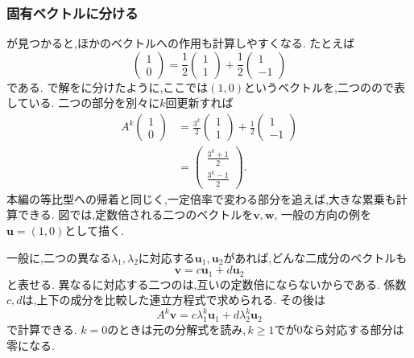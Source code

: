 \subsubsection{固有ベクトルに分ける}

が見つかると,ほかのベクトルへの作用も計算しやすくなる.
たとえば
\[
  \begin{pmatrix}1\\0\end{pmatrix}
  =\frac12\begin{pmatrix}1\\1\end{pmatrix}
   +\frac12\begin{pmatrix}1\\-1\end{pmatrix}
\]
である.
で解をに分けたように,ここでは$(1,0)$というベクトルを,二つのので表している.
二つの部分を別々に$k$回更新すれば
\[
  \begin{aligned}
    A^k\begin{pmatrix}1\\0\end{pmatrix}
      &=\frac{3^k}{2}\begin{pmatrix}1\\1\end{pmatrix}
        +\frac12\begin{pmatrix}1\\-1\end{pmatrix}\\
      &=\begin{pmatrix}\frac{3^k+1}{2}\\\frac{3^k-1}{2}\end{pmatrix}.
  \end{aligned}
\]
本編の等比型への帰着と同じく,一定倍率で変わる部分を追えば,大きな累乗も計算できる.
図では,定数倍される二つのベクトルを$\boldsymbol v,\boldsymbol w$,
一般の方向の例を$\boldsymbol u=(1,0)$として描く.
  \BookFigEigen

一般に,二つの異なる$\lambda_1,\lambda_2$に対応する$\boldsymbol{u}_1,\boldsymbol{u}_2$があれば,どんな二成分のベクトルも
\[
  \boldsymbol{v}=c\boldsymbol{u}_1+d\boldsymbol{u}_2
\]
と表せる.
異なるに対応する二つのは,互いの定数倍にならないからである.
係数$c,d$は,上下の成分を比較した連立方程式で求められる.
その後は
\[
  A^k\boldsymbol{v}
  =c\lambda_1^k\boldsymbol{u}_1+d\lambda_2^k\boldsymbol{u}_2
\]
で計算できる.
$k=0$のときは元の分解式を読み,\,$k\ge1$でが$0$なら対応する部分は零になる.

